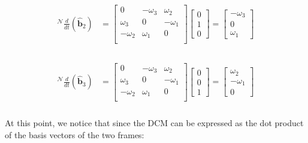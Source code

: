 \documentclass[
]{article}
\begin{document}
\[\begin{aligned}
\begin{aligned}
    {}^\mathcal{N}\frac{d}{dt}\left(\hat{\boldsymbol{b}}_2\right) &= \begin{bmatrix}
            0 & -\omega_3 & \omega_2 \\
            \omega_3 & 0 & -\omega_1 \\
            -\omega_2 & \omega_1 & 0 \\
        \end{bmatrix}
        \begin{bmatrix}
            0 \\ 1 \\ 0
        \end{bmatrix} = \begin{bmatrix}
            -\omega_3 \\ 0 \\ \omega_1
        \end{bmatrix} \\
\end{aligned}
\end{aligned}\]

\[\begin{aligned}
\begin{aligned}
    {}^\mathcal{N}\frac{d}{dt}\left(\hat{\boldsymbol{b}}_3\right) &= \begin{bmatrix}
            0 & -\omega_3 & \omega_2 \\
            \omega_3 & 0 & -\omega_1 \\
            -\omega_2 & \omega_1 & 0 \\
        \end{bmatrix}
        \begin{bmatrix}
            0 \\ 0 \\ 1
        \end{bmatrix} = \begin{bmatrix}
            \omega_2 \\ -\omega_1 \\ 0
        \end{bmatrix} \\
\end{aligned}
\end{aligned}\]

At this point, we notice that since the DCM can be expressed as the dot
product of the basis vectors of the two frames:
\end{document}
